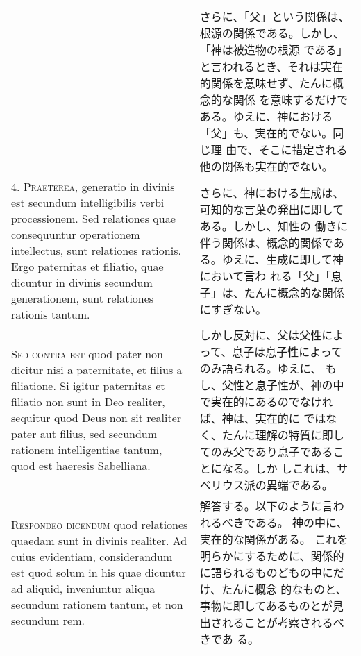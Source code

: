 \documentclass[10pt]{jsarticle} %
\begin{document}
\begin{longtable}{p{21em}p{21em}}
&

さらに、「父」という関係は、根源の関係である。しかし、「神は被造物の根源
 である」と言われるとき、それは実在的関係を意味せず、たんに概念的な関係
 を意味するだけである。ゆえに、神における「父」も、実在的でない。同じ理
 由で、そこに措定される他の関係も実在的でない。



\\



4. {\scshape Praeterea}, generatio in divinis est secundum intelligibilis verbi
processionem. Sed relationes quae consequuntur operationem intellectus,
sunt relationes rationis. Ergo paternitas et filiatio, quae dicuntur in
divinis secundum generationem, sunt relationes rationis tantum.


&

さらに、神における生成は、可知的な言葉の発出に即してある。しかし、知性の
 働きに伴う関係は、概念的関係である。ゆえに、生成に即して神において言わ
 れる「父」「息子」は、たんに概念的な関係にすぎない。


\\



{\scshape Sed contra est} quod pater non dicitur nisi a paternitate, et filius a
filiatione. Si igitur paternitas et filiatio non sunt in Deo realiter,
sequitur quod Deus non sit realiter pater aut filius, sed secundum
rationem intelligentiae tantum, quod est haeresis Sabelliana.


&

しかし反対に、父は父性によって、息子は息子性によってのみ語られる。ゆえに、
 もし、父性と息子性が、神の中で実在的にあるのでなければ、神は、実在的に
ではなく、たんに理解の特質に即してのみ父であり息子であることになる。しか
 しこれは、サベリウス派の異端である。

\\



{\scshape Respondeo dicendum} quod relationes quaedam sunt in divinis realiter. Ad
cuius evidentiam, considerandum est quod solum in his quae dicuntur ad
aliquid, inveniuntur aliqua secundum rationem tantum, et non secundum
rem. 


&

解答する。以下のように言われるべきである。
神の中に、実在的な関係がある。
これを明らかにするために、関係的に語られるものどもの中にだけ、たんに概念
 的なものと、事物に即してあるものとが見出されることが考察されるべきであ
 る。


\end{longtable}
\end{document}
